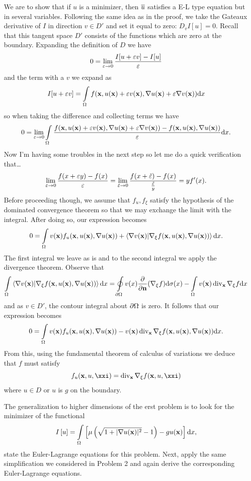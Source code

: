 \documentclass[12pt]{memoir}
\begin{document}
\begin{ptcbr}
    We are to show that if $ u$ is a minimizer, then $\overline u$ satisfies a E-L type equation but in several variables. Following the same idea as in the proof, we take the Gateaux derivative of $I$ in direction $v\in D'$ and set it equal to zero: $D_vI[u]=0$. Recall that this tangent space $D'$ consists of the functions which are zero at the boundary. Expanding the definition of $D$ we have 
    $$0=\lim_{\varepsilon\to 0}\frac{I[u+\varepsilon v]-I[u]}{\varepsilon}$$
    and the term with a $v$ we expand as 
    $$I[u+\varepsilon v]=\int\limits_\Omega f(\mathbf{x},u(\mathbf{x})+\varepsilon v(\mathbf{x}),\nabla u(\mathbf{x})+\varepsilon\nabla v(\mathbf{x}))\dd x$$
    so when taking the difference and collecting terms we have 
    $$0=\lim_{\varepsilon\to 0}\int\limits_\Omega \frac{f(\mathbf{x},u(\mathbf{x})+\varepsilon v(\mathbf{x}),\nabla u(\mathbf{x})+\varepsilon\nabla v(\mathbf{x}))-f(\mathbf{x},u(\mathbf{x}),\nabla u(\mathbf{x}))}{\varepsilon}\dd x.$$
    Now I'm having some troubles in the next step so let me do a quick verification that\dots
    $$\lim_{\varepsilon\to 0}\frac{f(x+\varepsilon y)-f(x)}{\varepsilon}=\lim_{\tilde{\varepsilon}\to 0}\frac{f(x+\tilde{\varepsilon})-f(x)}{\frac{\tilde{\varepsilon}}{y}}=yf'(x).$$
    Before proceeding though, we assume that $f_u,f_\xi$ satisfy the hypothesis of the dominated convergence theorem so that we may exchange the limit with the integral. After doing so, our expression becomes 
    $$0=\int\limits_\Omega v(\mathbf{x})f_u(\mathbf{x},u(\mathbf{x}),\nabla u(\mathbf{x}))+\braket{\nabla v(\mathbf{x})}{\nabla_\xi f(\mathbf{x},u(\mathbf{x}),\nabla u(\mathbf{x}))}\dd x.$$
    The first integral we leave as is and to the second integral we apply the divergence theorem. Observe that 
    $$\int\limits_\Omega\braket{\nabla v(\mathbf{x})}{\nabla_\xi f(\mathbf{x},u(\mathbf{x}),\nabla u(\mathbf{x}))}\dd x=\oint\limits_{\partial\Omega}v(x)\pdv{\mathbf{n}}(\nabla_\xi f)\dd\sigma(x)-\int\limits_\Omega v(\mathbf{x})\operatorname{div}_{\mathbf{x}}\nabla_\xi f\dd x$$
    and as $v\in D'$, the contour integral about $\partial\Omega$ is zero. It follows that our expression becomes
    $$0=\int\limits_\Omega v(\mathbf{x})f_u(\mathbf{x},u(\mathbf{x}),\nabla u(\mathbf{x}))-v(\mathbf{x})\operatorname{div}_{\mathbf{x}}\nabla_\xi f(\mathbf{x},u(\mathbf{x}),\nabla u(\mathbf{x}))\dd x.$$
    From this, using the fundamental theorem of calculus of variations we deduce that $f$ must satisfy 
    $$f_u(\vec x,u,\vec \xxi)=\div_{\vec x}\nb_\xi f(\vec x,u,\xxi)$$
    where $u\in D$ or $u$ is $g$ on the boundary.
\end{ptcbr}
\begin{Ej}
    The generalization to higher dimensions of the erst problem is to
look for the minimizer of the functional
$$I\left\lbrack u\right\rbrack=\int\limits_\Omega\left\lbrack\mu\left(\sqrt{1+|\nabla u(\mathbf{x})|^2}-1\right)-gu(\mathbf{x})\right\rbrack\dd x,$$
state the Euler-Lagrange equations for this problem.
Next, apply the same simplification we considered in Problem 2 and again derive the corresponding
Euler-Lagrange equations.
\end{Ej}
\end{document}
